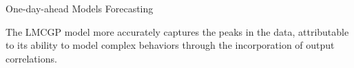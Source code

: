 %

\begin{frame}{One-day-ahead Models Forecasting}
	\centering
	\begin{figure}[htbp]
		\tiny
		\setlength{} 
		\setlength{}
		
		
	\end{figure}
	\vspace{-1.5em}
	\begin{block}{}
		The LMCGP model more accurately captures the peaks in the data, attributable to its ability to model complex behaviors through the incorporation of output correlations.
	\end{block}
\end{frame}



%		
%		
%		
%		
